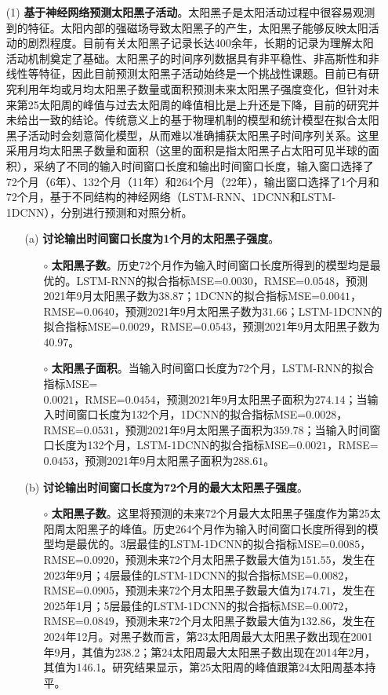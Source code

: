 \begin{enumerate}
  \item[(1)] \textbf{基于神经网络预测太阳黑子活动}。太阳黑子是太阳活动过程中很容易观测到的特征。太阳内部的强磁场导致太阳黑子的产生，太阳黑子能够反映太阳活动的剧烈程度。目前有关太阳黑子记录长达400余年，长期的记录为理解太阳活动机制奠定了基础。太阳黑子的时间序列数据具有非平稳性、非高斯性和非线性等特征，因此目前预测太阳黑子活动始终是一个挑战性课题。目前已有研究利用年均或月均太阳黑子数量或面积预测未来太阳黑子强度变化，但针对未来第25太阳周的峰值与过去太阳周的峰值相比是上升还是下降，目前的研究并未给出一致的结论。传统意义上的基于物理机制的模型和统计模型在拟合太阳黑子活动时会刻意简化模型，从而难以准确捕获太阳黑子时间序列关系。这里采用月均太阳黑子数量和面积（这里的面积是指太阳黑子占太阳可见半球的面积），采纳了不同的输入时间窗口长度和输出时间窗口长度，输入窗口选择了72个月（6年）、132个月（11年）和264个月（22年），输出窗口选择了1个月和72个月，基于不同结构的神经网络（LSTM-RNN、1DCNN和LSTM-1DCNN），分别进行预测和对照分析。
  \begin{itemize}
    \item[(a)] \textbf{讨论输出时间窗口长度为1个月的太阳黑子强度}。
    \begin{itemize}
      \item[$\circ$] \textbf{太阳黑子数}。历史72个月作为输入时间窗口长度所得到的模型均是最优的。LSTM-RNN的拟合指标MSE=$0.0030$，RMSE=$0.0548$，预测2021年9月太阳黑子数为$38.87$；1DCNN的拟合指标MSE=$0.0041$，RMSE=$0.0640$，预测2021年9月太阳黑子数为$31.66$；LSTM-1DCNN的拟合指标MSE=$0.0029$，RMSE=$0.0543$，预测2021年9月太阳黑子数为$40.97$。
      \item[$\circ$] \textbf{太阳黑子面积}。当输入时间窗口长度为72个月，LSTM-RNN的拟合指标MSE=\\$0.0021$，RMSE=$0.0454$，预测2021年9月太阳黑子面积为$274.14$；当输入时间窗口长度为132个月，1DCNN的拟合指标MSE=$0.0028$，RMSE=$0.0531$，预测2021年9月太阳黑子面积为$359.78$；当输入时间窗口长度为132个月，LSTM-1DCNN的拟合指标MSE=$0.0021$，RMSE=$0.0453$，预测2021年9月太阳黑子面积为$288.61$。
    \end{itemize}
    \item[(b)] \textbf{讨论输出时间窗口长度为72个月的最大太阳黑子强度}。
    \begin{itemize}
      \item[$\circ$] \textbf{太阳黑子数}。这里将预测的未来72个月最大太阳黑子强度作为第25太阳周太阳黑子的峰值。历史264个月作为输入时间窗口长度所得到的模型均是最优的。3层最佳的LSTM-1DCNN的拟合指标MSE=$0.0085$，RMSE=$0.0920$，预测未来72个月太阳黑子数最大值为$151.55$，发生在2023年9月；4层最佳的LSTM-1DCNN的拟合指标MSE=$0.0082$，RMSE=$0.0905$，预测未来72个月太阳黑子数最大值为$174.71$，发生在2025年1月；5层最佳的LSTM-1DCNN的拟合指标MSE=$0.0072$，RMSE=$0.0849$，预测未来72个月太阳黑子数最大值为$132.86$，发生在2024年12月。对黑子数而言，第23太阳周最大太阳黑子数出现在2001年9月，其值为238.2；第24太阳周最大太阳黑子数出现在2014年2月，其值为146.1。研究结果显示，第25太阳周的峰值跟第24太阳周基本持平。 

\end{itemize}
\end{itemize}
\end{enumerate}
